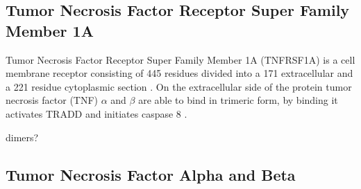 \subsection{Tumor Necrosis Factor Receptor Super Family Member 1A}
Tumor Necrosis Factor Receptor Super Family Member 1A (TNFRSF1A) is a cell membrane receptor consisting of 445 residues divided into a 171 extracellular and a 221 residue cytoplasmic section \cite{}.
On the extracellular side of the protein tumor necrosis factor (TNF) $\alpha$ and $\beta$ are able to bind in trimeric form, by binding it activates TRADD \cite{} and initiates caspase 8 \cite{}.

dimers? 
\label{subsec:CD_TNFRSF1A}

\subsection{Tumor Necrosis Factor Alpha and Beta}
\label{subsec:CD_TNF_A_B}